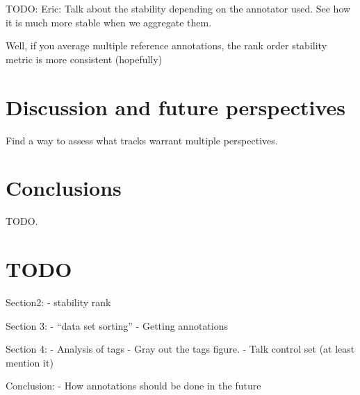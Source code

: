 \documentclass{article}
\begin{document}
TODO: Eric: Talk about the stability depending on the annotator used. See how it is much more stable when we aggregate them.

Well, if you average multiple reference annotations, the rank order stability metric is more consistent (hopefully)

\section{Discussion and future perspectives}

Find a way to assess what tracks warrant multiple perspectives.

\section{Conclusions}

TODO.

\section{TODO}

Section2:
- stability rank

Section 3:
- ``data set sorting''
- Getting annotations

Section 4:
- Analysis of tags
- Gray out the tags figure.
- Talk control set (at least mention it)


Conclusion:
- How annotations should be done in the future





\end{document}
